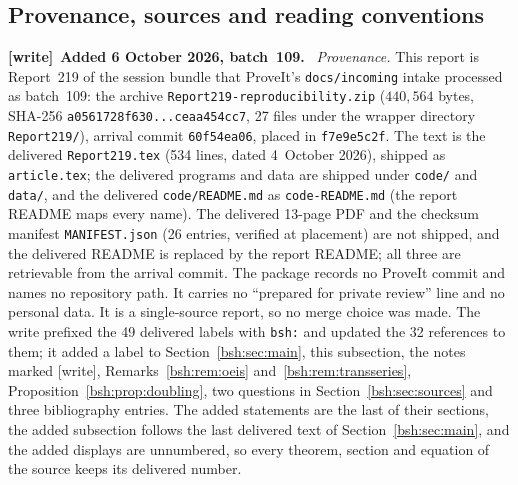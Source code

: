 \documentclass[11pt,letterpaper]{article}
\theoremstyle{remark}\newtheorem{remark}[theorem]{Remark}
\newcommand{\file}[1]{\nolinkurl{#1}}
\newenvironment{writenote}[1][]{\par\smallskip\begingroup\small
 \noindent\textbf{[write]}\if\relax\detokenize{#1}\relax\else~\textbf{#1.}\fi\ }%
 {\par\endgroup\smallskip}
\begin{document}
\subsection{Provenance, sources and reading conventions}\label{bsh:sec:provenance}
\begin{writenote}[Added 6 October 2026, batch~109]
\emph{Provenance.} This report is Report~219 of the session bundle that
ProveIt's \file{docs/incoming} intake processed as batch~109: the archive
\file{Report219-reproducibility.zip} ($440{,}564$ bytes, SHA-256
\file{a0561728f630...ceaa454cc7}, 27 files under the wrapper directory
\file{Report219/}), arrival commit \file{60f54ea06}, placed in
\file{f7e9e5c2f}. The text is the delivered \file{Report219.tex} (534 lines,
dated 4~October 2026), shipped as \file{article.tex}; the delivered programs
and data are shipped under \file{code/} and \file{data/}, and the delivered
\file{code/README.md} as \file{code-README.md} (the report README maps every
name). The delivered 13-page PDF and the checksum manifest
\file{MANIFEST.json} (26 entries, verified at placement) are not shipped,
and the delivered README is replaced by the report README; all three are
retrievable from the arrival commit. The package records no ProveIt commit
and names no repository path. It carries no ``prepared for private review''
line and no personal data. It is a single-source report, so no merge choice
was made. The write prefixed the 49 delivered labels with \file{bsh:} and
updated the 32 references to them; it added a label to
Section~\ref{bsh:sec:main}, this subsection, the notes marked [write],
Remarks~\ref{bsh:rem:oeis} and~\ref{bsh:rem:transseries},
Proposition~\ref{bsh:prop:doubling}, two questions in
Section~\ref{bsh:sec:sources} and three bibliography entries. The added
statements are the last of their sections, the added subsection follows the
last delivered text of Section~\ref{bsh:sec:main}, and the added displays
are unnumbered, so every theorem, section and equation of the source keeps
its delivered number.


\end{writenote}
\end{document}
